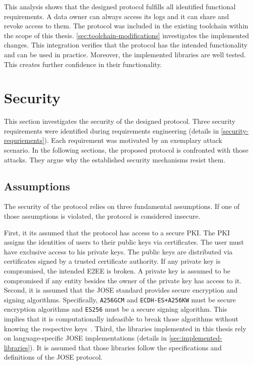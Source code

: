 \documentclass[../main.tex]{subfiles}
\begin{document}
This analysis shows that the designed protocol fulfills all identified functional requirements.
A data owner can always access its logs and it can share and revoke access to them.
The protocol was included in the existing toolchain within the scope of this thesis.
\cref{sec:toolchain-modifications} investigates the implemented changes.
This integration verifies that the protocol has the intended functionality and can be used in practice.
Moreover, the implemented libraries are well tested.
This creates further confidence in their functionality.

\section{Security}
\label{sec:evaluation-sec}

This section investigates the security of the designed protocol.
Three security requirements were identified during requirements engineering (details in \cref{security-requriements}).
Each requirement was motivated by an exemplary attack scenario.
In the following sections, the proposed protocol is confronted with those attacks.
They argue why the established security mechanisms resist them.

\subsection{Assumptions}

The security of the protocol relies on three fundamental assumptions.
If one of those assumptions is violated, the protocol is considered insecure.

First, it its assumed that the protocol has access to a secure PKI.
The PKI assigns the identities of users to their public keys via certificates.
The user must have exclusive access to his private keys.
The public keys are distributed via certificates signed by a trusted certificate authority.
If any private key is compromised, the intended E2EE is broken.
A private key is assumed to be compromised if any entity besides the owner of the private key has access to it.
Second, it is assumed that the JOSE standard provides secure encryption and signing algorithms.
Specifically, \verb|A256GCM| and \verb|ECDH-ES+A256KW| must be secure encryption algorithms and \verb|ES256| must be a secure signing algorithm.
This implies that it is computationally infeasible to break those algorithms without knowing the respective keys~\cite{Katz2020}.
Third, the libraries implemented in this thesis rely on language-specific JOSE implementations (details in \cref{sec:implemented-libraries}).
It is assumed that those libraries follow the specifications and definitions of the JOSE protocol.
\end{document}
